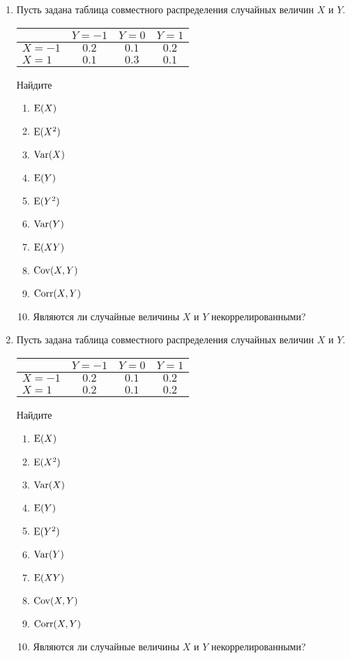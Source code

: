 \begin{enumerate}
\item Пусть задана таблица совместного распределения случайных величин $X$ и $Y$.

\begin{center}
\begin{tabular}{lccc}
\toprule
                       & $Y=-1$  & $Y=0$   & $Y=1$   \\ \midrule
$X=-1$                 & $0.2$ & $0.1$ & $0.2$ \\
 $X=1$                 & $0.1$ & $0.3$ & $0.1$ \\ \bottomrule
\end{tabular}
\end{center}

Найдите
\begin{enumerate}
\item $\operatorname{E}(X)$
\item $\operatorname{E}(X^{2})$
\item $\operatorname{Var}(X)$
\item $\operatorname{E}(Y)$
\item $\operatorname{E}(Y^{2})$
\item $\operatorname{Var}(Y)$
\item $\operatorname{E}(XY)$
\item $\operatorname{Cov}(X,Y)$
\item $\operatorname{Corr}(X,Y)$
\item Являются ли случайные величины $X$ и $Y$ некоррелированными?
\end{enumerate}

\item Пусть задана таблица совместного распределения случайных величин $X$ и $Y$.

\begin{center}
\begin{tabular}{lccc}
\toprule
                       & $Y=-1$  & $Y=0$  & $Y=1$  \\ \midrule
$X=-1$                 & $0.2$ & $0.1$ & $0.2$ \\
 $X=1$                 & $0.2$ & $0.1$ & $0.2$ \\ \bottomrule
\end{tabular}
\end{center}

Найдите
\begin{enumerate}
\item $\operatorname{E}(X)$
\item $\operatorname{E}(X^{2})$
\item $\operatorname{Var}(X)$
\item $\operatorname{E}(Y)$
\item $\operatorname{E}(Y^{2})$
\item $\operatorname{Var}(Y)$
\item $\operatorname{E}(XY)$
\item $\operatorname{Cov}(X,Y)$
\item $\operatorname{Corr}(X,Y)$
\item Являются ли случайные величины $X$ и $Y$ некоррелированными?
\end{enumerate}


\end{enumerate}
